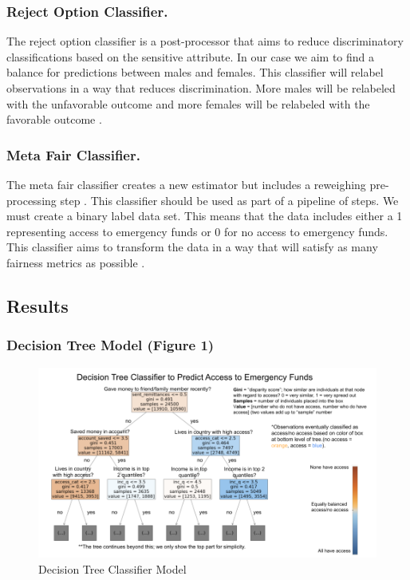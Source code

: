 \documentclass[water,article,submit,moreauthors,pdftex]{mdpi}
\begin{document}
\hypertarget{reject-option-classifier.}{%
\subsubsection{Reject Option
Classifier.}\label{reject-option-classifier.}}

The reject option classifier is a post-processor that aims to reduce
discriminatory classifications based on the sensitive attribute. In our
case we aim to find a balance for predictions between males and females.
This classifier will relabel observations in a way that reduces
discrimination. More males will be relabeled with the unfavorable
outcome and more females will be relabeled with the favorable outcome
\citep{kamiran2012decision}.

\hypertarget{meta-fair-classifier.}{%
\subsubsection{Meta Fair Classifier.}\label{meta-fair-classifier.}}

The meta fair classifier creates a new estimator but includes a
reweighing pre-processing step \citep{celis2019classification}. This
classifier should be used as part of a pipeline of steps. We must create
a binary label data set. This means that the data includes either a 1
representing access to emergency funds or 0 for no access to emergency
funds. This classifier aims to transform the data in a way that will
satisfy as many fairness metrics as possible
\citep{agarwal2018reductions}.

\hypertarget{results}{%
\subsection{Results}\label{results}}

\hypertarget{decision-tree-model-figure-1}{%
\subsubsection{Decision Tree Model (Figure
1)}\label{decision-tree-model-figure-1}}

\begin{figure}
\centering
\includegraphics[width=\textwidth,height=0.5\textheight]{images/decision_tree_annotated.png}
\caption{Decision Tree Classifier Model}
\end{figure}
\end{document}
